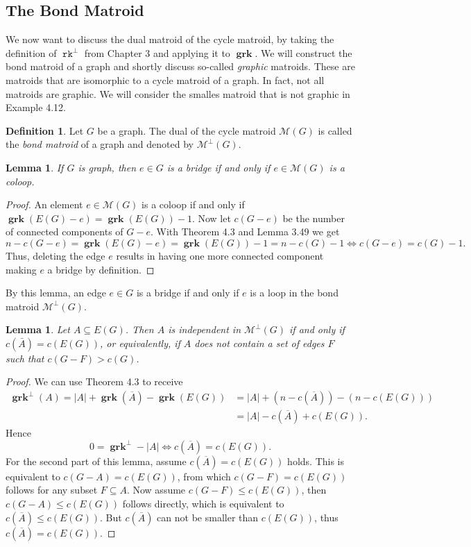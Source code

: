 \documentclass[12pt,a4paper, twoside, autooneside=false]{scrartcl}
\newtheorem{lemma}[theorem]{Lemma}
\theoremstyle{definition}
\newtheorem{definition}[theorem]{Definition}
\theoremstyle{remark}
\numberwithin{equation}{section}
\DeclareMathOperator{\rk}{\mathtt{rk}}
\newcommand{\M}{\mathcal{M}} %
\DeclareMathOperator{\grk}{\mathbf{grk}} %
\begin{document}
\subsection{The Bond Matroid}
We now want to discuss the dual matroid of the cycle matroid, by taking the definition of $\rk^\perp$ from Chapter 3 and applying it to $\grk$. We will construct the bond matroid of a graph and shortly discuss so-called \textit{graphic} matroids. These are matroids that are isomorphic to a cycle matroid of a graph. In fact, not all matroids are graphic. We will consider the smalles matroid that is not graphic in Example 4.12.
\begin{definition}
Let $G$ be a graph. The dual of the cycle matroid $\M(G)$ is called the \textit{bond matroid} of a graph and denoted by $\M^\perp(G)$.
\end{definition}
\begin{lemma}
If $G$ is graph, then $e \in G$ is a bridge if and only if $e \in \M(G)$ is a coloop.
\end{lemma}
\begin{proof}
An element $e \in \M(G)$ is a coloop if and only if $\grk(E(G) - e) = \grk(E(G)) - 1$. Now let  $c(G - e)$ be the number of connected components of $G-e$. With Theorem 4.3 and Lemma 3.49 we get
\[
n - c(G - e) = \grk(E(G) - e) = \grk(E(G)) - 1 = n - c(G) - 1 \Longleftrightarrow c(G - e) = c(G) - 1.
\]
Thus, deleting the edge $e$ results in having one more connected component making $e$ a bridge by definition.
\end{proof}
By this lemma, an edge $e \in G$ is a bridge if and only if $e$ is a loop in the bond matroid $\M^\perp(G)$. 
\begin{lemma} 
Let $A \subseteq E(G)$. Then $A$ is independent in $\M^\perp(G)$ if and only if $c(\bar{A}) = c(E(G))$, or equivalently, if $A$ does not contain a set of edges $F$ such that $c(G - F) > c(G)$.
\end{lemma}
\begin{proof}
We can use Theorem 4.3 to receive
\begin{align*}
\grk^\perp(A) = |A| + \grk(\overline{A}) - \grk(E(G)) &= |A| + (n - c(\overline{A})) - (n - c(E(G)))\\
&= |A| - c(\overline{A}) + c(E(G)).
\end{align*}
Hence 
\[
0 = \grk^\perp - |A|  \Longleftrightarrow c(\overline{A}) = c(E(G)).
\]
For the second part of this lemma, assume $c(\overline{A}) = c(E(G))$ holds. This is equivalent to $c(G - A) = c(E(G))$, from which $c(G - F) = c(E(G))$ follows for any subset $F \subseteq A$. Now assume $c(G - F) \leq c(E(G))$, then $c(G - A) \leq c(E(G))$ follows directly, which is equivalent to $c(\overline{A}) \leq c(E(G))$. But $c(\overline{A})$ can not be smaller than $c(E(G))$, thus $c(\overline{A}) = c(E(G))$. 
\end{proof}
\end{document}
